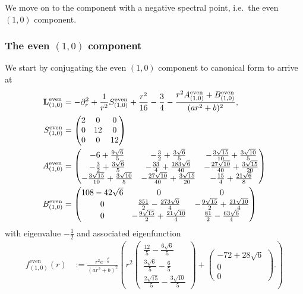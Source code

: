 \documentclass[11pt,reqno]{amsart}
\theoremstyle{remark}
\newcommand{\Lf}{\textup{\textbf{L}}}
\theoremstyle{definition}
\begin{document}
We move on to the component with a negative spectral point, i.e.~the even $(1,0)$ component.
\subsubsection*{The even $(1,0)$ component}
We start by conjugating the even $(1,0)$ component to canonical form to arrive at
\begin{align*}
   \Lf_{(1,0)}^{\mathrm{even}}
&= -\partial_r^2 + \frac{1}{r^2}S_{(1,0)}^{\mathrm{even}} + \frac{r^2}{16}-\frac34- \frac{r^2 A_{(1,0)}^{\mathrm{even}}+B_{(1,0)}^{\mathrm{even}}}
         {(ar^2+b)^2}, \\
S_{(1,0)}^{\mathrm{even}} &= \begin{pmatrix}
    2 & 0 & 0 \\
    0 & 12 & 0 \\
    0 & 0 & 12 \\
\end{pmatrix} \\
A_{(1,0)}^{\mathrm{even}} &= \begin{pmatrix}-6 + \frac{9 \sqrt{6}}{5} & - \frac{3}{2} + \frac{3 \sqrt{6}}{5} & - \frac{3 \sqrt{15}}{10} + \frac{3 \sqrt{10}}{5}\\- \frac{3}{2} + \frac{3 \sqrt{6}}{5} & - \frac{33}{4} + \frac{183 \sqrt{6}}{40} & - \frac{27 \sqrt{10}}{40} + \frac{3 \sqrt{15}}{20}\\- \frac{3 \sqrt{15}}{10} + \frac{3 \sqrt{10}}{5} & - \frac{27 \sqrt{10}}{40} + \frac{3 \sqrt{15}}{20} & - \frac{15}{4} + \frac{21 \sqrt{6}}{8}\end{pmatrix} \\
B_{(1,0)}^{\mathrm{even}} &= \begin{pmatrix}108 - 42 \sqrt{6} & 0 & 0\\0 & \frac{351}{2} - \frac{273 \sqrt{6}}{4} & - \frac{9 \sqrt{15}}{2} + \frac{21 \sqrt{10}}{4}\\0 & - \frac{9 \sqrt{15}}{2} + \frac{21 \sqrt{10}}{4} & \frac{81}{2} - \frac{63 \sqrt{6}}{4}\end{pmatrix}
\end{align*}
with eigenvalue $-\frac12$ and associated eigenfunction 
\begin{align*}
    f_{(1,0)}^{\mathrm{even}}(r)&:=\frac{r^2e^{-\frac{r^2}{8}}}{(ar^2+b)^2} \left(
                                r^2 \begin{pmatrix}\frac{12}{5} - \frac{6 \sqrt{6}}{5}\\
                                \frac{3 \sqrt{6}}{5} - \frac{6}{5}\\
                                \frac{2 \sqrt{15}}{5} - \frac{3 \sqrt{10}}{5}\end{pmatrix}
                                +   \begin{pmatrix}
                                        -72 + 28 \sqrt{6}  \\  0 \\  0
                                    \end{pmatrix}.
                            \right)
\end{align*}
\end{document}

